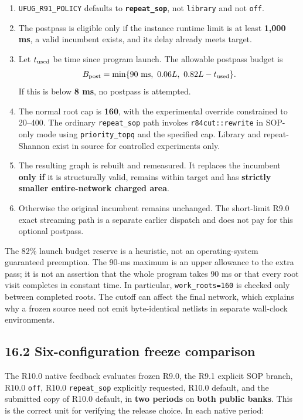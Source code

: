 \documentclass[a4paper,10pt]{article}
\providecommand{\tightlist}{\setlength{\itemsep}{0pt}\setlength{\parskip}{0pt}}
\theoremstyle{definition}
\theoremstyle{remark}
\begin{document}
\begin{enumerate}
\def\labelenumi{\arabic{enumi}.}
\tightlist
\item
  \texttt{UFUG\_R91\_POLICY} defaults to \textbf{\texttt{repeat\_sop}}, not \texttt{library} and not \texttt{off}.
\item
  The postpass is eligible only if the instance runtime limit is at least \textbf{1,000 ms}, a valid incumbent exists, and its delay already meets target.
\item
  Let \(t_{\rm used}\) be time since program launch. The allowable postpass budget is \[
  B_{\rm post}=\min\{90\text{ ms},\ 0.06L,\ 0.82L-t_{\rm used}\}.
  \] If this is below \textbf{8 ms}, no postpass is attempted.
\item
  The normal root cap is \textbf{160}, with the experimental override constrained to 20--400. The ordinary \texttt{repeat\_sop} path invokes \texttt{r84cut::rewrite} in SOP-only mode using \texttt{priority\_topq} and the specified cap. Library and repeat-Shannon exist in source for controlled experiments only.
\item
  The resulting graph is rebuilt and remeasured. It replaces the incumbent \textbf{only if} it is structurally valid, remains within target and has \textbf{strictly smaller entire-network charged area}.
\item
  Otherwise the original incumbent remains unchanged. The short-limit R9.0 exact streaming path is a separate earlier dispatch and does not pay for this optional postpass.
\end{enumerate}

The 82\% launch budget reserve is a heuristic, not an operating-system guaranteed preemption. The 90-ms maximum is an upper allowance to the extra pass; it is not an assertion that the whole program takes 90 ms or that every root visit completes in constant time. In particular, \texttt{work\_roots=160} is checked only between completed roots. The cutoff can affect the final network, which explains why a frozen source need not emit byte-identical netlists in separate wall-clock environments.

\subsection{16.2 Six-configuration freeze comparison}\label{six-configuration-freeze-comparison}

The R10.0 native feedback evaluates frozen R9.0, the R9.1 explicit SOP branch, R10.0 \texttt{off}, R10.0 \texttt{repeat\_sop} explicitly requested, R10.0 default, and the submitted copy of R10.0 default, in \textbf{two periods} on \textbf{both public banks}. This is the correct unit for verifying the release choice. In each native period:
\end{document}
